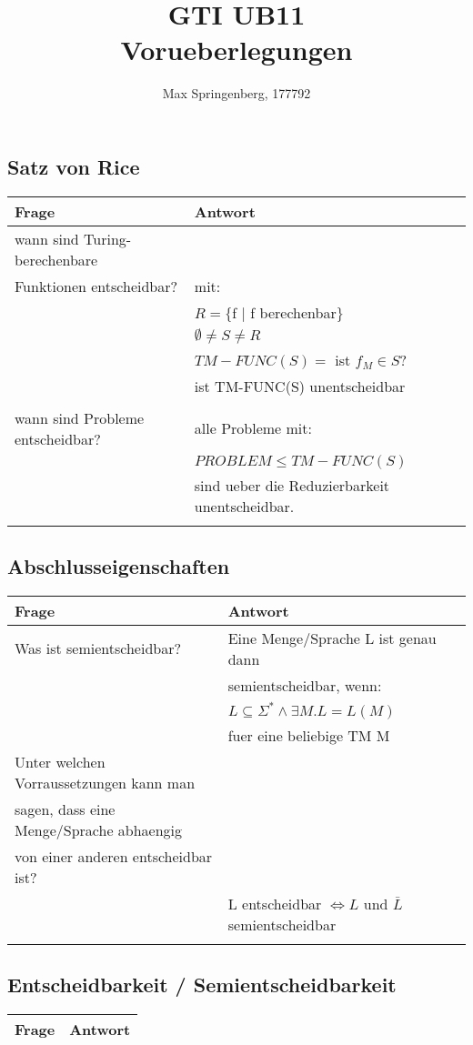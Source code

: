 \documentclass{article}
\author{Max Springenberg, 177792}
\title{
    GTI UB11\\
    Vorueberlegungen
}
\date{}
\begin{document}
\maketitle
\newpage
\subsection{Satz von Rice}
\begin{tabular}{l|l}
    Frage&
    Antwort\\
    \hline

    wann sind Turing-berechenbare\\
    Funktionen entscheidbar?
    &mit:\\
    &$R = \{$f $|$ f berechenbar$\}$\\
    &$\emptyset \neq S \neq R$\\
    &$TM-FUNC(S) =$ ist $f_M \in S$?\\
    &ist TM-FUNC(S) unentscheidbar\\
    \\
    wann sind Probleme entscheidbar?
    &alle Probleme mit:\\
    &$PROBLEM \leq TM-FUNC(S)$\\
    &sind ueber die Reduzierbarkeit unentscheidbar.\\
    \\
\end{tabular}

\subsection{Abschlusseigenschaften}
\begin{tabular}{l|l}
    Frage&
    Antwort\\
    \hline

    Was ist semientscheidbar?
    &Eine Menge/Sprache L ist genau dann \\
    &semientscheidbar, wenn:\\
    &$L \subseteq \Sigma^* \land \exists M.L = L(M)$\\
    &fuer eine beliebige TM M\\
    Unter welchen Vorraussetzungen kann man\\
    sagen, dass eine Menge/Sprache abhaengig\\
    von einer anderen entscheidbar ist?\\
    &L entscheidbar $\Leftrightarrow L$ und $\bar L$ semientscheidbar\\
    &
    \\
\end{tabular}

\subsection{Entscheidbarkeit / Semientscheidbarkeit}
\begin{tabular}{l|l}
    Frage&
    Antwort\\
    \hline

\end{tabular}
\end{document}
